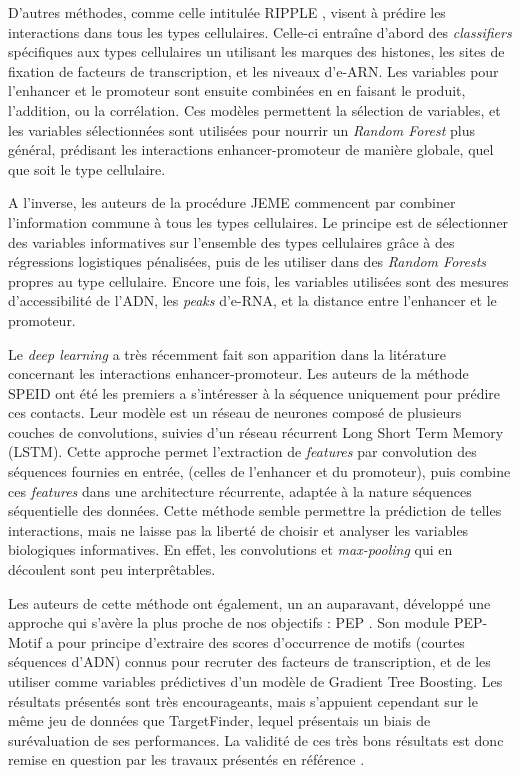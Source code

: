 \documentclass[french]{llncs}
\begin{document}
D'autres méthodes, comme celle intitulée RIPPLE \cite{roy_predictive_2015}, visent à prédire les interactions dans tous les types cellulaires.
Celle-ci entraîne d'abord des \textit{classifiers} spécifiques aux types cellulaires un utilisant les marques des histones, les sites de fixation de facteurs de transcription, et les niveaux d'e-ARN. Les variables pour l'enhancer et le promoteur sont ensuite combinées en en faisant le produit, l'addition, ou la corrélation. Ces modèles permettent la sélection de variables, et les variables sélectionnées sont utilisées pour nourrir un \textit{Random Forest} plus général, prédisant les interactions enhancer-promoteur de manière globale, quel que soit le type cellulaire.

A l'inverse, les auteurs de la procédure JEME \cite{cao_reconstruction_2017} commencent par combiner l'information commune à tous les types cellulaires. Le principe est de sélectionner des variables informatives sur l'ensemble des types cellulaires grâce à des régressions logistiques pénalisées, puis de les utiliser dans des \textit{Random Forests} propres au type cellulaire. Encore une fois, les variables utilisées sont des mesures d'accessibilité de l'ADN, les \textit{peaks} d'e-RNA, et la distance entre l'enhancer et le promoteur.

Le \textit{deep learning} a très récemment fait son apparition dans la litérature concernant les interactions enhancer-promoteur. Les auteurs de la méthode SPEID \cite{singh_predicting_2018} ont été les premiers a s'intéresser à la séquence uniquement pour prédire ces contacts. Leur modèle est un réseau de neurones composé de plusieurs couches de convolutions, suivies d'un réseau récurrent Long Short Term Memory (LSTM). Cette approche permet l'extraction de \textit{features} par convolution des séquences fournies en entrée, (celles de l'enhancer et du promoteur), puis combine ces \textit{features} dans une architecture récurrente, adaptée à la nature séquences séquentielle des données.
Cette méthode semble permettre la prédiction de telles interactions, mais ne laisse pas la liberté de choisir et analyser les variables biologiques informatives. En effet, les convolutions et \textit{max-pooling} qui en découlent sont peu interprêtables.

Les auteurs de cette méthode ont également, un an auparavant, développé une approche qui s'avère la plus proche de nos objectifs : PEP \cite{yang2017exploiting}. Son module PEP-Motif a pour principe d'extraire des scores d'occurrence de motifs (courtes séquences d'ADN) connus pour recruter des facteurs de transcription, et de les utiliser comme variables prédictives d'un modèle de Gradient Tree Boosting. Les résultats présentés sont très encourageants, mais s'appuient cependant sur le même jeu de données que TargetFinder, lequel présentais un biais de surévaluation de ses performances. La validité de ces très bons résultats est donc remise en question par les travaux présentés en référence \cite{xi_local_2018}.
\end{document}
